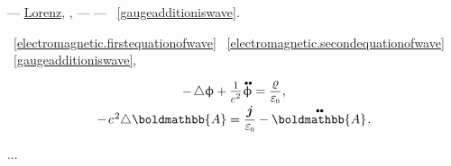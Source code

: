 \vspace{-0.2em} \noindent --- \href{https://en.wikipedia.org/wiki/Lorenz_gauge_condition}{Lorenz},    , \:--- \href{https://en.wikipedia.org/wiki/Harmonic_function}{}\:--- ~\eqref{gaugeadditioniswave}.

~\eqref{electromagnetic.firstequationofwave} ~\eqref{electromagnetic.secondequationofwave} ~\eqref{gaugeadditioniswave},   

\nopagebreak\begin{equation}
\begin{array}{c}
- \hspace{-0.1ex} \Laplacian \upphi + \raisemath{.07em}{\scalebox{0.84}{$\displaystyle \frac{\raisemath{-0.16em}{1}}{\raisemath{-0.1em}c^{\hspace{.16ex}2}}$}} \hspace{.16ex} \mathdotdotabove{\upphi} = \smash{\displaystyle \frac{\chargedensity}{\raisemath{.16em}{\vacuumpermittivity}}}
\hspace{.1ex} ,
\\[.5em]
- \hspace{.3ex} c^{\hspace{.16ex}2} \hspace{-0.4ex} \Laplacian \hspace{.05ex} \boldmathbb{A} = \displaystyle \frac{\currentdensity}{\raisemath{.16em}{\vacuumpermittivity}} - \mathdotdotabove{\boldmathbb{A}}
\hspace{.2ex} .
\end{array}
\end{equation}

...






